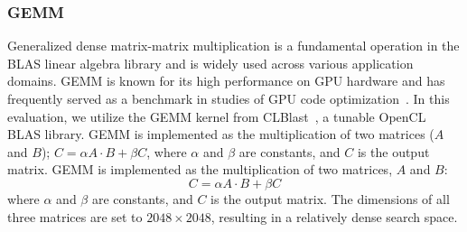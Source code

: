 \subsubsection{GEMM} \label{subsubsec:evaluation_setup_kernel_gemm}
Generalized dense matrix-matrix multiplication is a fundamental operation in the BLAS linear algebra library and is widely used across various application domains. GEMM is known for its high performance on GPU hardware and has frequently served as a benchmark in studies of GPU code optimization~\cite{CLTune,li2009note,pruning}.
In this evaluation, we utilize the GEMM kernel from CLBlast~\cite{CLBlast2018}, a tunable OpenCL BLAS library. 
\iflackofspace
GEMM is implemented as the multiplication of two matrices ($A$ and $B$); $C = \alpha A \cdot B + \beta C$, where $\alpha$ and $\beta$ are constants, and $C$ is the output matrix. 
\else
GEMM is implemented as the multiplication of two matrices, $A$ and $B$:
\begin{equation}
    \nonumber C = \alpha A \cdot B + \beta C
\end{equation}
where $\alpha$ and $\beta$ are constants, and $C$ is the output matrix. 
\fi
The dimensions of all three matrices are set to $2048 \times 2048$, resulting in a relatively dense search space.

